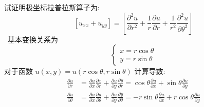 	{}
	试证明极坐标拉普拉斯算子为:
	\[[u_{xx}   +u_{yy}]= [ {	\frac{\partial^2 u }{\partial r^2 } +\frac{1}{r } \frac{\partial u }{\partial r } +
	\frac{1}{r^2 } \frac{\partial ^2 u }{\partial \theta ^2
	} }]\]
	{\证} ~基本变换关系为 
\[ \begin{cases}
	 x=r\cos \theta\\
	 y=r\sin \theta
	\end{cases}\]
对于函数 $ u(x,y)=u(r\cos \theta,r\sin \theta)$ 计算导数:
\[
\begin{aligned}
	\frac{\partial u}{\partial r}&=\frac{\partial u}{\partial x } \frac{\partial x}{\partial r }+  \frac{\partial u}{\partial y } \frac{\partial y}{\partial r } = \cos \theta \frac{\partial u}{\partial x } +  \sin \theta \frac{\partial u}{\partial y } \\
	\frac{\partial u}{\partial \theta}&=\frac{\partial u}{\partial x } \frac{\partial u}{\partial \theta }+  \frac{\partial u}{\partial y } \frac{\partial y}{\partial \theta } = -r \sin \theta \frac{\partial u}{\partial x } +  r\cos \theta \frac{\partial u}{\partial y } \\
\end{aligned}\]



